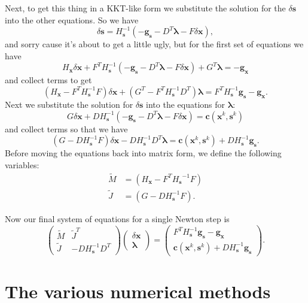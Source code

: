 \documentclass[letterpaper,12pt]{article}
\theoremstyle{remark}
\newcommand{\x}{\mathbf{x}}
\newcommand{\C}{\mathbf{c}}
\newcommand{\s}{\mathbf{s}}
\newcommand{\la}{\mathbf{\lambda}}
\newcommand{\dx}{\delta \x}
\newcommand{\ds}{\delta \s}
\newcommand{\Hx}{ {H_\x} }
\newcommand{\Hs}{ {H_\s} }
\newcommand{\Hsinv}{H_\s^{-1}}
\newcommand{\gx}{ {\mathbf{g}_\x} }
\newcommand{\gs}{ {\mathbf{g}_\s} }
\begin{document}
Next, to get this thing in a KKT-like form we substitute the solution for the $\ds$ into the other equations. So we have
\begin{equation}
\ds = \Hsinv \left(-\gs - D^T \la - F\dx \right),
\end{equation}
and sorry cause it's about to get a little ugly, but for the first set of equations we have
\begin{equation*}
\Hx\dx + F^T\Hsinv \left(-\gs - D^T\la - F\dx \right) +G^T \la = -\gx
\end{equation*}
and collect terms to get
\begin{equation}
\left(\Hx - F^T\Hsinv F \right)\dx + (G^T - F^T\Hsinv D^T)\la = 
F^T\Hsinv \gs -\gx.
\end{equation}
Next we substitute the solution for $\ds$ into the equations for $\la$:
\begin{equation*}
G\dx + D\Hsinv \left(-\gs - D^T\la - F\dx\right) = \C (\x^k, \s^k)
\end{equation*}
and collect terms so that we have
\begin{equation}
(G - D\Hsinv F)\dx - D\Hsinv D^T\la = \C (\x^k, \s^k) + D\Hsinv\gs.
\end{equation}
Before moving the equations back into matrix form, we define the following variables:
\begin{align}
\tilde{M} &= (\Hx - F^T\Hs^{-1}F) \\
\tilde{J} &= (G - D\Hsinv F). 
\end{align}

Now our final system of equations for a single Newton step is
\begin{equation}
\begin{pmatrix}
\tilde{M} & \tilde{J}^T \\
\tilde{J} & -D\Hsinv D^T 
\end{pmatrix}
\begin{pmatrix}
\dx \\
\la
\end{pmatrix} =
\begin{pmatrix}
F^T\Hsinv\gs -\gx \\
\C (\x^k, \s^k) + D\Hsinv\gs
\end{pmatrix}.
\end{equation}

\section{The various numerical methods}
\end{document}
